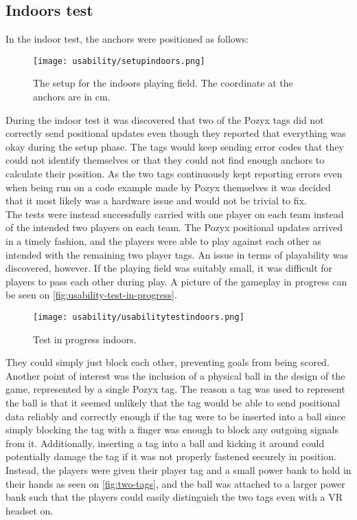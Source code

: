 \subsection{Indoors test}
In the indoor test, the anchors were positioned as follows:
\begin{figure}[H]
    \centering
    \texttt{[image: usability/setupindoors.png]}
    \caption{The setup for the indoors playing field. The coordinate at the anchors are in cm.}
    \label{fig:test2-indoor-setup}
\end{figure}
\noindent
During the indoor test it was discovered that two of the Pozyx tags did not correctly send positional updates even though they reported that everything was okay during the setup phase.
The tags would keep sending error codes that they could not identify themselves or that they could not find enough anchors to calculate their position.
As the two tags continuously kept reporting errors even when being run on a code example made by Pozyx themselves it was decided that it most likely was a hardware issue and would not be trivial to fix.
\\
The tests were instead successfully carried with one player on each team instead of the intended two players on each team.
The Pozyx positional updates arrived in a timely fashion, and the players were able to play against each other as intended with the remaining two player tags.
An issue in terms of playability was discovered, however.
If the playing field was suitably small, it was difficult for players to pass each other during play.
A picture of the gameplay in progress can be seen on \autoref{fig:usability-test-in-progress}.
\begin{figure}[H]
    \centering
    \texttt{[image: usability/usabilitytestindoors.png]}
    \caption{Test in progress indoors.}
    \label{fig:usability-test-in-progress}
\end{figure}
\noindent
They could simply just block each other, preventing goals from being scored.
Another point of interest was the inclusion of a physical ball in the design of the game, represented by a single Pozyx tag.
The reason a tag was used to represent the ball is that it seemed unlikely that the tag would be able to send positional data reliably and correctly enough if the tag were to be inserted into a ball since simply blocking the tag with a finger was enough to block any outgoing signals from it.
Additionally, inserting a tag into a ball and kicking it around could potentially damage the tag if it was not properly fastened securely in position.
Instead, the players were given their player tag and a small power bank to hold in their hands as seen on \autoref{fig:two-tags}, and the ball was attached to a larger power bank such that the players could easily distinguish the two tags even with a VR headset on.

